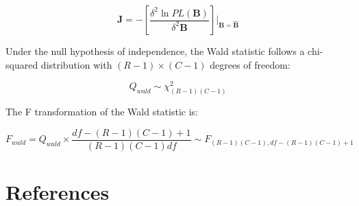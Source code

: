 \documentclass[
  12pt,
]{book}
\begin{document}
\[
\boldsymbol{J} = -\left[\frac{\delta^{2} \ln PL\left(\boldsymbol{B}\right)}{\delta^{2} \boldsymbol{B}}\right] \bigg|_{\boldsymbol{B} = \hat{\boldsymbol{B}}}
\]

Under the null hypothesis of independence, the Wald statistic follows a chi-squared distribution with \((R-1) \times (C-1)\) degrees of freedom:

\[
Q_{wald} \sim \chi^{2}_{(R-1)(C-1)}
\]

The F transformation of the Wald statistic is:

\[
F_{wald} = Q_{wald} \times \frac{df - (R-1)(C-1) + 1}{(R-1)(C-1) df} \sim F_{(R-1)(C-1), df - (R-1)(C-1) + 1}
\]

\hypertarget{references}{%
\chapter*{References}\label{references}}

  
\end{document}
